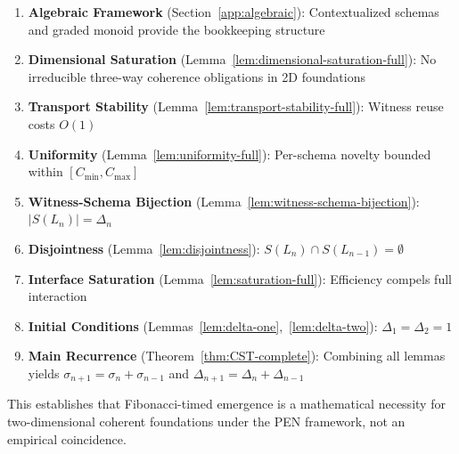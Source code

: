 \documentclass[11pt]{article}
\theoremstyle{definition}
\theoremstyle{remark}
\begin{document}
\begin{enumerate}
\item \textbf{Algebraic Framework} (Section~\ref{app:algebraic}): Contextualized schemas and
graded monoid provide the bookkeeping structure

\item \textbf{Dimensional Saturation} (Lemma~\ref{lem:dimensional-saturation-full}): No irreducible
three-way coherence obligations in 2D foundations

\item \textbf{Transport Stability} (Lemma~\ref{lem:transport-stability-full}): Witness reuse costs
$O(1)$

\item \textbf{Uniformity} (Lemma~\ref{lem:uniformity-full}): Per-schema novelty bounded within
$[C_{\min}, C_{\max}]$

\item \textbf{Witness-Schema Bijection} (Lemma~\ref{lem:witness-schema-bijection}): $|S(L_n)| = \Delta_n$

\item \textbf{Disjointness} (Lemma~\ref{lem:disjointness}): $S(L_n) \cap S(L_{n-1}) = \emptyset$

\item \textbf{Interface Saturation} (Lemma~\ref{lem:saturation-full}): Efficiency compels full
interaction

\item \textbf{Initial Conditions} (Lemmas~\ref{lem:delta-one},~\ref{lem:delta-two}):
$\Delta_1 = \Delta_2 = 1$

\item \textbf{Main Recurrence} (Theorem~\ref{thm:CST-complete}): Combining all lemmas yields
$\sigma_{n+1} = \sigma_n + \sigma_{n-1}$ and $\Delta_{n+1} = \Delta_n + \Delta_{n-1}$
\end{enumerate}

This establishes that Fibonacci-timed emergence is a mathematical necessity for two-dimensional
coherent foundations under the PEN framework, not an empirical coincidence.
\end{document}
